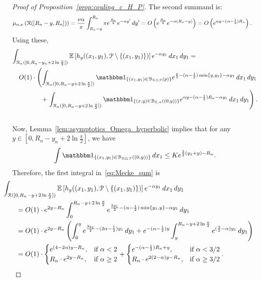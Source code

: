 \begin{proof}[Proof of Proposition~\ref{prop:couling_c_H_P}]
The second summand is: 
\begin{align*}
	\mu_{\alpha,\nu} \left( {\mathcal R}([R_n - y,R_n]) \right) 
    &= \frac{\nu \alpha}{\pi} \int_{R_n - y}^{R_n} \pi e^{\frac{R_n}{2}} e^{-\alpha y'} \, dy' 
    	= O\left(e^{\frac{R_n}{2}} e^{-\alpha (R_n-y)}\right) = O\left(e^{\alpha y - (\alpha - \frac{1}{2})R_n}\right). 
\end{align*}
Using these, 
\begin{eqnarray} 
	\lefteqn{\int_{\Rcal_n ([0, R_n - y_n + 2 \ln \frac{\pi}{2}])} \Exp{h_y((x_1,y_1), \Pcal \setminus \{(x_1,y_1)\})} 
    e^{-\alpha y_1} \, dx_1 \, dy_1 =}  \nonumber \\
	& & O(1) \cdot \left(\int_{\Rcal_n ([0, R_n - y+ 2 \ln \frac{\pi}{2}])} \ind{(x_1,y_1) \in \BallSym{p}} 		e^{\frac{y}{2} - (\alpha - \frac{1}{2}) \min \{y,y_1\} - \alpha y_1} \, dx_1 \, dy_1 \right.  \nonumber \\ 
	& & \hspace{1cm}+\left. \int_{\Rcal_n ([0, R_n - y + 2 \ln \frac{\pi}{2}])} 
    	\ind{(x,y) \in \BallHyp{(0,y)}} 
    	e^{\alpha y - (\alpha - \frac{1}{2})R_n - \alpha y_1} \, dx_1 \, dy_1\right). \nonumber \\
	& &\label{eq:Mecke_sum}
\end{eqnarray}
Now, Lemma~\ref{lem:asymptotics_Omega_hyperbolic} implies that 
for any $y \in [0, R_n - y_n + 2 \ln \frac{\pi}{2}]$, we have 
\[ 
	\int \ind{(x_1,y_1) \in \BallSym{(0,y)}} \, dx_1 \leq K e^{\frac{3}{2} (y_1 + y) - R_n}.
\]
Therefore, the first integral in~\eqref{eq:Mecke_sum} is 
\begin{align*}
	&\hspace{-20pt}\int_{\Rcal ([0, R_n - y + 2 \ln \frac{\pi}{2}])} \Exp{h_y((x_1,y_1), \Pcal \setminus \{(x_1,y_1)\})} 
    	e^{-\alpha y_1} \, dx_1 \, dy_1 \\
	&= O(1) \cdot e^{2 y - R_n} \int_{0}^{R_n - y + 2 \ln \frac{\pi}{2}} 
    	e^{\frac{3y_1}{2} - (\alpha - \frac{1}{2})\min\{y_1,y\} - \alpha y_1} \, dy_1 \\
 	&=  O(1) \cdot e^{2 y - R_n} \left( \int_{0}^{y} e^{\frac{3y_1}{2} - (2\alpha - \frac{1}{2})y_1} \, dy_1 
 		+ e^{-(\alpha-\frac{1}{2}) y}\int_{y}^{R_n - y + 2 \ln \frac{\pi}{2}} e^{(\frac{3}{2} - \alpha) y_1} \, dy_1 \right)\\
  	&= O(1) \cdot 
	\begin{cases}
	e^{(4-2\alpha) y - R_n}, & \mbox{if $\alpha < 2$} \\
	R_n \cdot e^{2y - R_n}, & \mbox{if $\alpha \geq 2$}
	\end{cases}
	+
	\begin{cases}
	e^{-(\alpha - \frac{1}{2})R_n +y}, & \mbox{if $\alpha < 3/2$} \\
	R_n \cdot  e^{2(2-\alpha)y - R_n}, & \mbox{if $\alpha \geq 3/2$}
	\end{cases}.
\end{align*}


\end{proof}
